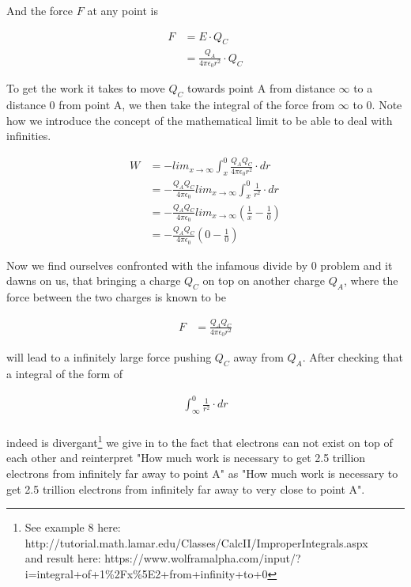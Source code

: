 \documentclass[paper=a4, fontsize=11pt]{scrartcl} %
\numberwithin{equation}{section} %
\numberwithin{figure}{section} %
\numberwithin{table}{section} %
\begin{document}
\clearpage

And the force $F$ at any point is

\begin{align} \label{eq:4}
F &= E \cdot Q_C \\
  &= \frac{Q_A}{4 \pi \epsilon_0 r^2} \cdot Q_C
\end{align}

To get the work it takes to move $Q_C$ towards point A from distance $\infty$ to a distance 0 from point A,
we then take the integral of the force from $\infty$ to 0. Note how we introduce the concept of the mathematical limit
to be able to deal with infinities.

\begin{align} \label{eq:5}
W &= - lim_{x\to\infty} \int_x^0{\frac{Q_A Q_C}{4 \pi \epsilon_0 r^2}} \cdot dr \\
  &= - \frac{Q_A Q_C}{4 \pi \epsilon_0 } lim_{x\to\infty} \int_x^0{\frac{1}{r^2}} \cdot dr \\
  &= - \frac{Q_A Q_C}{4 \pi \epsilon_0 } lim_{x\to\infty} \left( \frac{1}{x} - \frac{1}{0} \right) \\
  &= - \frac{Q_A Q_C}{4 \pi \epsilon_0 } \left( 0 - \frac{1}{0} \right)
\end{align}

Now we find ourselves confronted with the infamous divide by 0 problem and it dawns on us, that bringing a charge
$Q_C$ on top on another charge $Q_A$, where the force between the two charges is known to be

\begin{align} \label{eq:6}
F &= \frac{Q_A  Q_C}{4 \pi \epsilon_0 r^2}
\end{align}

will lead to a infinitely large force pushing $Q_C$ away from $Q_A$. After checking that a integral of the form of

\begin{align} \label{eq:7}
\int_\infty^0{\frac{1}{r^2}} \cdot dr \\
\end{align}

indeed is divergant\footnote{ See example 8 here: http://tutorial.math.lamar.edu/Classes/CalcII/ImproperIntegrals.aspx \\
and result here: https://www.wolframalpha.com/input/?i=integral+of+1\%2Fx\%5E2+from+infinity+to+0 

} we give in to the fact that electrons can not exist on top of each other and reinterpret "How much work is necessary to get
2.5 trillion electrons from infinitely far away to point A" as "How much work is necessary to get
2.5 trillion electrons from infinitely far away to very close to point A".
\end{document}
